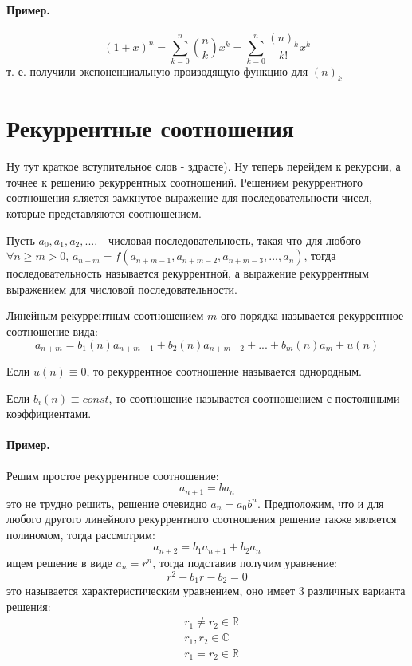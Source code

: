 \paragraph{Пример.}
\[
	{\left(1+x\right)}^n = \sum_{k=0}^n \binom{n}{k} x^k = \sum_{k=0}^n \frac{{\left(n\right)}_k}{k!} x^k
\]
т. е. получили экспоненциальную произодящую функцию для $\left(n\right)_k$

\section{Рекуррентные соотношения}

Ну тут краткое вступительное слов - здрасте). Ну теперь перейдем к рекурсии, а точнее к решению рекуррентных соотношений. Решением рекуррентного соотношения яляется замкнутое выражение для последовательности чисел, которые представляются соотношением.

\begin{Def}
Пусть $a_0, a_1, a_2, ....$ - числовая последовательность, такая что для любого $\forall n \ge m > 0$, $a_{n+m} = f\left(a_{n+m-1}, a_{n+m-2}, a_{n+m-3}, ... , a_{n}\right)$, тогда последовательность называется рекуррентной, а выражение рекуррентным выражением для числовой последовательности.
\end{Def}

\begin{Def}
Линейным рекуррентным соотношением $m$-ого порядка называется рекуррентное соотношение вида:
\[
	a_{n+m} = b_1 \left(n\right) a_{n+m-1} + b_2 \left(n\right) a_{n+m-2} + ... + b_{m} \left(n\right) a_{m} + u\left(n\right)
\]

Если $u\left(n\right) \equiv 0$, то рекуррентное соотношение называется однородным.

Если $b_i \left(n\right) \equiv const$, то соотношение называется соотношением с постоянными коэффициентами.
\end{Def}

\paragraph{Пример.}
Решим простое рекуррентное соотношение:
\[
	a_{n+1} = b a_n
\]
это не трудно решить, решение очевидно $a_n = a_0 b^n$. Предположим, что и для любого другого линейного рекуррентного соотношения решение также является полиномом, тогда рассмотрим:
\[
	a_{n+2} = b_1 a_{n+1} + b_2 a_{n}
\]
ищем решение в виде $a_n = r^n$, тогда подставив получим уравнение:
\[
	r^2 - b_1 r - b_2 = 0
\]
это называется характеристическим уравнением, оно имеет 3 различных варианта решения:
\[
	\begin{split}
	& r_1 \not= r_2 \in \mathbb{R} \\
	& r_1, r_2 \in \mathbb{C} \\
	& r_1 = r_2 \in \mathbb{R}
	\end{split}
\]

